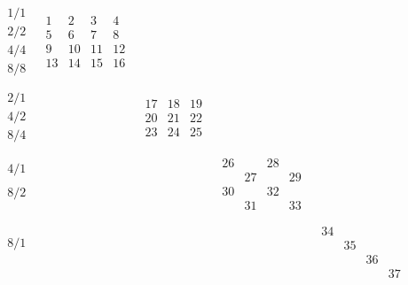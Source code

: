 \documentclass[12pt,a4paper]{amsart}
\begin{document}
\begin{align*}
  \begin{array}{r||c|c|c|c}
    \begin{array}{r}
      1/1 \\ 2/2 \\ 4/4 \\ 8/8 \\
    \end{array}
    &  \begin{array}{c|c|c|c}
    1&2&3&4\\ \hline
    5&6&7&8\\ \hline
    9&10&11&12\\ \hline
    13&14&15&16\\
  \end{array}
&&& \\ \hline
    \begin{array}{r}
      2/1 \\ 4/2 \\ 8/4 \\
    \end{array}
    &&
\begin{array}{c|c|c}
    17&18&19\\ \hline
    20&21&22\\ \hline
    23&24&25\\
  \end{array}
&& \\ \hline
    \begin{array}{r}
      4/1 \\ \\ 8/2 \\ \\
    \end{array}
    &&&
  \begin{array}{cc|cc}
    26&&28&\\
    &27&&29\\ \hline
    30&&32&\\
    &31&&33\\
  \end{array}
& \\ \hline
    \begin{array}{r}
      8/1 \\ \\ \\ \\
    \end{array}
    &&&&
  \begin{array}{cccc}
    34&&&\\
    &35&&\\
    &&36&\\
    &&&37\\
  \end{array}
 \\
  \end{array}
\end{align*}
\end{document}
